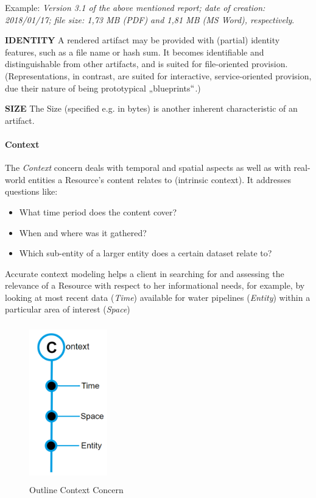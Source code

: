 Example: \textit{Version 3.1 of the above mentioned report; date of creation: 2018/01/17; file size: 1,73 MB (PDF) and 1,81 MB (MS Word), respectively}.



\textbf{IDENTITY} A rendered artifact may be provided with (partial) identity features, such as a file name or hash sum. It becomes identifiable and distinguishable from other artifacts, and is suited for file-oriented provision. (Representations, in contrast, are suited for interactive, service-oriented provision, due their nature of being prototypical „blueprints$``$.) 

\textbf{SIZE }The Size (specified e.g. in bytes) is another inherent characteristic of an artifact. 



\paragraph{Context\\}
The \textit{Context} concern deals with temporal and spatial aspects as well as with real-world entities a Resource’s content relates to (intrinsic context). It addresses questions like: 
 \begin{itemize}
	\item What time period does the content cover? 
 	\item When and where was it gathered? 
 	\item Which sub-entity of a larger entity does a certain dataset relate to?
\end{itemize} 
Accurate context modeling helps a client in searching for and assessing the relevance of a Resource with respect to her informational needs, for example, by looking at most recent data (\textit{Time}) available for water pipelines (\textit{Entity}) within a particular area of interest (\textit{Space}) 


\begin{figure}[H]
	\begin{Center}
		\includegraphics[width=1.33in,height=2.68in]{./media/image37.png}
		\caption{Outline Context Concern}
		\label{fig:outline_context_concern}
	\end{Center}
\end{figure} 



